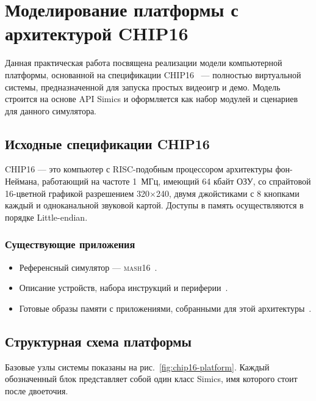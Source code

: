 \chapter{Моделирование платформы с архитектурой CHIP16}\label{chap:lab05}

Данная практическая работа посвящена реализации модели компьютерной платформы, основанной на спецификации CHIP16~\cite{chip16-ngemu} --- полностью виртуальной системы, предназначенной для запуска простых видеоигр и демо. Модель строится на основе API Simics и оформляется как набор модулей и сценариев для данного симулятора.

\section{Исходные спецификации CHIP16}

CHIP16 --- это компьютер с RISC-подобным процессором архитектуры фон-Неймана, работающий на частоте 1~МГц, имеющий 64 кбайт ОЗУ, со спрайтовой 16-цветной графикой разрешением 320×240, двумя джойстиками с 8 кнопками каждый и одноканальной звуковой картой. Доступы в память осуществляются в порядке Little-endian.

\subsection{Существующие приложения}

\begin{itemize}
    \item Референсный симулятор --- \textsc{mash16}~\cite{chip16-mach16}.
    \item Описание устройств, набора инструкций и периферии~\cite{chip16-machspec}.
    \item Готовые образы памяти с приложениями, собранными для этой архитектуры~\cite{chip16-roms}.
\end{itemize}

\section{Структурная схема платформы}

Базовые узлы системы показаны на рис.~\ref{fig:chip16-platform}. Каждый обозначенный блок представляет собой один класс Simics, имя которого стоит после двоеточия.

